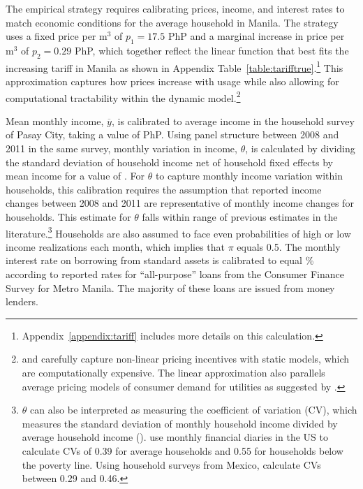 \documentclass[12pt]{article}
\begin{document}
The empirical strategy requires calibrating prices, income, and interest rates to match economic conditions for the average household in Manila.  The strategy uses a fixed price per $\text{m}^{3}$ of $p_1=17.5$ PhP and a marginal increase in price per $\text{m}^{3}$ of $p_2=0.29$ PhP, which together reflect the linear function that best fits the increasing tariff in Manila as shown in Appendix Table~\ref{table:tarifftrue}.\footnote{Appendix~\ref{appendix:tariff} includes more details on this calculation. }  This approximation captures how prices increase with usage while also allowing for computational tractability within the dynamic model.\footnote{\cite{wjv} and \cite{szabo2015value} carefully capture non-linear pricing incentives with static models, which are computationally expensive.  The linear approximation also parallels average pricing models of consumer demand for utilities as suggested by \cite{ito2014consumers}.}  

Mean monthly income, $\overline{y}$, is calibrated to average income in the household survey of Pasay City, taking a value of PhP.  Using panel structure between 2008 and 2011 in the same survey, monthly variation in income, $\theta$, is calculated by dividing the standard deviation of household income net of household fixed effects by mean income for a value of \unskip.  For $\theta$ to capture monthly income variation within households, this calibration requires the assumption that reported income changes between 2008 and 2011 are representative of monthly income changes for households.  This estimate for $\theta$ falls within range of previous estimates in the literature.\footnote{$\theta$ can also be interpreted as measuring the coefficient of variation (CV), which measures the standard deviation of monthly household income divided by average household income (\cite{hannagan2015income}).  \cite{hannagan2015income} use monthly financial diaries in the US to calculate CVs of 0.39 for average households and 0.55 for households below the poverty line.  Using household surveys from Mexico, \cite{amuedo2011remittances} calculate CVs between 0.29 and 0.46.}  Households are also assumed to face even probabilities of high or low income realizations each month, which implies that $\pi$ equals 0.5.  The monthly interest rate on borrowing from standard assets is calibrated to equal \unskip\% according to reported rates for ``all-purpose'' loans from the Consumer Finance Survey for Metro Manila.  The majority of these loans are issued from money lenders.
\end{document}
